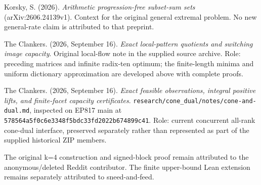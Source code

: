 Korsky, S. (2026). \emph{Arithmetic progression-free subset-sum sets} (arXiv:2606.24139v1). Context for the original general extremal problem. No new general-rate claim is attributed to that preprint.

The Clankers. (2026, September 16). \emph{Exact local-pattern quotients and switching image capacity}. Original local-flow note in the supplied source archive. Role: preceding matrices and infinite radix-ten optimum; the finite-length minima and uniform dictionary approximation are developed above with complete proofs.

The Clankers. (2026, September 16). \emph{Exact feasible observations, integral positive lifts, and finite-facet capacity certificates}. \nolinkurl{research/cone_dual/notes/cone-and-dual.md}, inspected on EP817 main at \nolinkurl{578564a5f0c6e3348f5bdc33fd2022b674899c41}. Role: current concurrent all-rank cone-dual interface, preserved separately rather than represented as part of the supplied historical ZIP members.

The original k=4 construction and signed-block proof remain attributed to the anonymous/deleted Reddit contributor. The finite upper-bound Lean extension remains separately attributed to sneed-and-feed.
